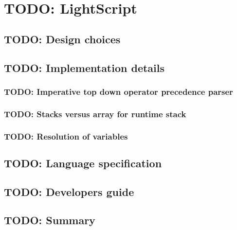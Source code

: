 \chapter{TODO: LightScript}
\section{TODO: Design choices}
\section{TODO: Implementation details}
\subsection{TODO: Imperative top down operator precedence parser}
\subsection{TODO: Stacks versus array for runtime stack}
\subsection{TODO: Resolution of variables}
\section{TODO: Language specification}
\section{TODO: Developers guide}
\section{TODO: Summary}
